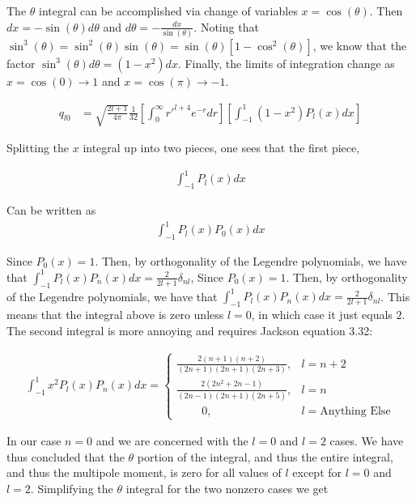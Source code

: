 \documentclass[paper=a4, fontsize=11pt]{scrartcl} %
\numberwithin{equation}{section} %
\numberwithin{figure}{section} %
\numberwithin{table}{section} %
\begin{document}
The $\theta$ integral can be accomplished via change of variables $x=\cos(\theta)$. Then $dx = -\sin(\theta)d\theta$ and $d\theta = -\frac{dx}{\sin(\theta)}$. Noting that $\sin^3(\theta) = \sin^2(\theta)\sin(\theta) = \sin(\theta)[1-\cos^2(\theta)]$, we know that the factor $\sin^3(\theta)d\theta = (1 - x^2)dx$. Finally, the limits of integration change as $x = \cos(0) \rightarrow 1$  and $x = \cos(\pi) \rightarrow -1$. 

\begin{align}
q_{l0} &= \sqrt{\frac{2l + 1}{4 \pi}}\frac{1}{32}\left[\int_0^\infty r'^{l+4}e^{-r}dr\right]\left[\int_{-1}^{1}(1-x^2)P_l(x)dx\right]
\end{align} 

Splitting the $x$ integral up into two pieces, one sees that the first piece,

\begin{align}
\int_{-1}^{1}P_l(x)dx
\end{align}

Can be written as 
\begin{align}
\int_{-1}^{1}P_l(x)P_0(x)dx
\end{align}

Since $P_0(x) = 1$. Then, by orthogonality of the Legendre polynomials, we have that $\int_{-1}^1 P_l(x)P_n(x)dx = \frac{2}{2l+1}\delta_{nl}$, Since $P_0(x) = 1$. Then, by orthogonality of the Legendre polynomials, we have that $\int_{-1}^1 P_l(x)P_n(x)dx = \frac{2}{2l+1}\delta_{nl}$. This means that the integral above is zero unless $l=0$, in which case it just equals $2$. The second integral is more annoying and requires Jackson equation 3.32:

\begin{align}
\int_{-1}^1x^2P_l(x)P_n(x)dx = \begin{cases}
\frac{2(n+1)(n+2)}{(2n+1)(2n+1)(2n+3)}, & l=n+2\\
\frac{2(2n^2 + 2n - 1)}{(2n-1)(2n+1)(2n+5)}, & l=n\\
\ \ \ \ \ \ \ \ \ \  0, & l = \text{Anything Else}
\end{cases}
\end{align}

In our case $n=0$ and we are concerned with the $l=0$ and $l=2$ cases. We have thus concluded that the $\theta$ portion of the integral, and thus the entire integral, and thus the multipole moment, is zero for all values of $l$ except for $l=0$ and $l=2$. Simplifying the $\theta$ integral for the two nonzero cases we get
\end{document}
